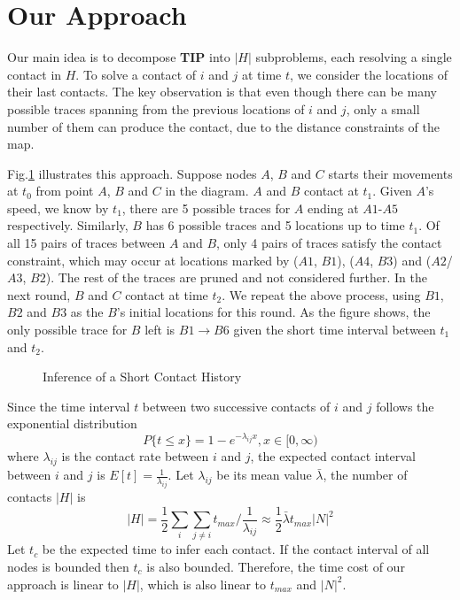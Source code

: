 \section{Our Approach}
\label{sec:approach}
Our main idea is to decompose \textbf{TIP} into $|H|$ subproblems,
each resolving a single contact in $H$.
To solve a contact of $i$ and $j$ at time $t$, we consider the locations
of their last contacts. The key observation is that even though
there can be many possible traces spanning from the previous locations
of $i$ and $j$, only a small number of them can produce the contact,
due to the distance constraints of the map.

Fig.\ref{fig:des} illustrates this approach.
Suppose nodes $A$, $B$ and $C$ starts their movements at $t_0$ from point $A$, $B$ and $C$
in the diagram. $A$ and $B$ contact at $t_1$. Given $A$'s speed, we know by $t_1$, there are
5 possible traces for $A$ ending at $A1$-$A5$ respectively. Similarly, $B$ has 6 possible traces
and 5 locations up to time $t_1$. Of all 15 pairs of traces between $A$ and $B$, only 4
pairs of traces satisfy the contact constraint, which may occur at locations marked by ($A1$, $B1$),
($A4$, $B3$) and ($A2$/$A3$, $B2$). The rest of the traces are pruned and not considered further.
In the next round, $B$ and $C$ contact at time $t_2$. We repeat the above process,
using $B1$, $B2$ and $B3$ as the $B$'s initial locations for this round. As the figure shows,
the only possible trace for $B$ left is $B1 \rightarrow B6$ given the short time interval between $t_1$ and
$t_2$.

\begin{figure}[th]
\centering
{}
\caption{Inference of a Short Contact History}
\label{fig:des}
\end{figure}


Since the time interval $t$ between two successive contacts of $i$ and $j$ follows the exponential distribution
\[P\{t\leq x\}=1-e^{-\lambda_{ij} x}, x\in[0,\infty)\]
where $\lambda_{ij}$ is the contact rate between $i$ and $j$, the expected contact interval between $i$ and $j$
is $E[t]=\frac{1}{\lambda_{ij}}$. Let $\lambda_{ij}$ be its mean value $\bar{\lambda}$,
the number of contacts $|H|$ is
\begin{equation*}
|H| =  \frac{1}{2}\sum_i\sum_{j\not=i} t_{max}/\frac{1}{\lambda_{ij}}
\approx\frac{1}{2}\bar{\lambda} t_{max}|N|^2
\label{equ:complexity}
\end{equation*}
Let $t_{c}$ be the expected time to infer each contact.
If the contact interval of all nodes is bounded then $t_{c}$
is also bounded. Therefore, the time cost of our
approach is linear to $|H|$, which is also linear to
$t_{max}$ and $|N|^2$.

